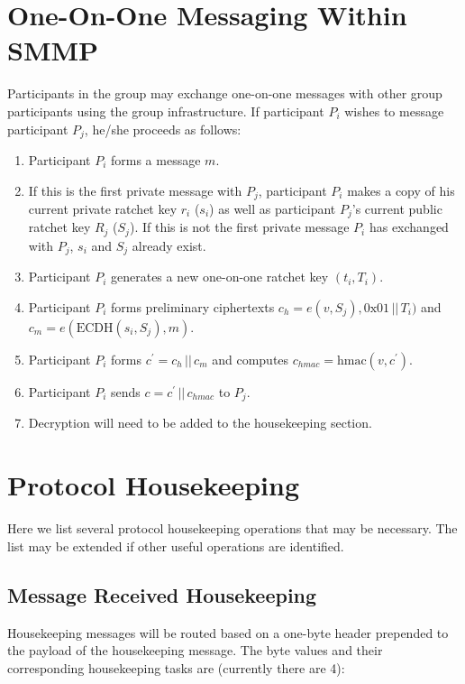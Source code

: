 \documentclass[%
preprint,
amsmath,amssymb,
aps,
prb,
floatfix,
]{revtex4-1}
\begin{document}
\section{\label{sec:im}One-On-One Messaging Within SMMP}
Participants in the group may exchange one-on-one messages with other group
participants using the group infrastructure. If participant $P_i$ wishes to
message participant $P_j$, he/she proceeds as follows:
\begin{enumerate}
\item Participant $P_i$ forms a message $m$.
\item If this is the first private message with $P_j$, participant $P_i$ makes
a copy of his current private ratchet key $r_i$
($s_i$) as well as participant $P_j$'s current public ratchet key $R_j$ ($S_j$).
If this is not the first private message $P_i$ has exchanged with $P_j$,
$s_i$ and $S_j$ already exist.
\item Participant $P_i$ generates a new one-on-one ratchet key $(t_i, T_i)$.
\item Participant $P_i$ forms preliminary ciphertexts $c_h = e(v, S_j), 0\mathrm{x}01
\, || \, T_i)$ and $c_m = e(\mathrm{ECDH}(s_i, S_j), m)$.
\item Participant $P_i$ forms $c^\prime = c_h \, || \, c_m$ and computes $c_{hmac} =
\mathrm{hmac}(v, c^\prime)$.
\item Participant $P_i$ sends $c = c^\prime \, || \, c_{hmac}$ to $P_j$.
\item Decryption will need to be added to the housekeeping section.
\end{enumerate}

\section{\label{sec:housekeeping}Protocol Housekeeping}
Here we list several protocol housekeeping operations that may be necessary.
The list may be extended if other useful operations are identified.

\subsection{\label{sec:receivehousekeeping}Message Received Housekeeping}
Housekeeping messages will be routed based on a one-byte header prepended to the
payload of the housekeeping message. The byte values and their corresponding
housekeeping tasks are (currently there are 4): \\
\end{document}
